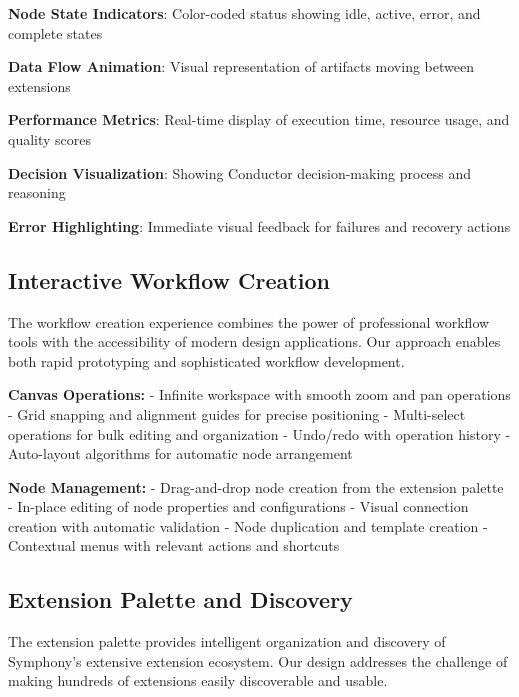 \begin{expandedlist}
    \item \textbf{Node State Indicators}: Color-coded status showing idle, active, error, and complete states
    \item \textbf{Data Flow Animation}: Visual representation of artifacts moving between extensions
    \item \textbf{Performance Metrics}: Real-time display of execution time, resource usage, and quality scores
    \item \textbf{Decision Visualization}: Showing Conductor decision-making process and reasoning
    \item \textbf{Error Highlighting}: Immediate visual feedback for failures and recovery actions
\end{expandedlist}

\subsection*{Interactive Workflow Creation}

The workflow creation experience combines the power of professional workflow tools with the accessibility of modern design applications. Our approach enables both rapid prototyping and sophisticated workflow development.

\textbf{Canvas Operations:}
- Infinite workspace with smooth zoom and pan operations
- Grid snapping and alignment guides for precise positioning
- Multi-select operations for bulk editing and organization
- Undo/redo with operation history
- Auto-layout algorithms for automatic node arrangement

\textbf{Node Management:}
- Drag-and-drop node creation from the extension palette
- In-place editing of node properties and configurations
- Visual connection creation with automatic validation
- Node duplication and template creation
- Contextual menus with relevant actions and shortcuts

\subsection*{Extension Palette and Discovery}

The extension palette provides intelligent organization and discovery of Symphony's extensive extension ecosystem. Our design addresses the challenge of making hundreds of extensions easily discoverable and usable.

